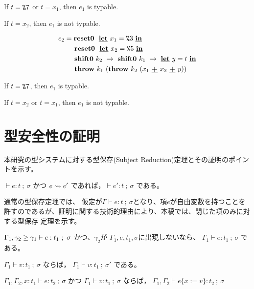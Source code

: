 If $t=\texttt{\%}{7}$ or $t=x_1$, then $e_1$ is typable.

If $t=x_2$, then $e_1$ is not typable.

\begin{align*}
  e_2 & = \textbf{reset0} ~~\underline{\textbf{let}}~x_1=\texttt{\%}{3}~\underline{\textbf{in}} \\
      & \phantom{=}~~ \textbf{reset0} ~~\underline{\textbf{let}}~x_2=\texttt{\%}{5}~\underline{\textbf{in}} \\
      & \phantom{=}~~ \textbf{shift0}~k_2~\to~ \textbf{shift0}~k_1~\to~ \underline{\textbf{let}}~y=t~\underline{\textbf{in}} \\
      & \phantom{=}~~ \textbf{throw}~k_1~(\textbf{throw}~k_2~(x_1~\underline{\textbf{+}}~x_2~\underline{\textbf{+}}~y))
\end{align*}

If $t=\texttt{\%}{7}$, then $e_1$ is typable.

If $t=x_2$ or $t=x_1$, then $e_1$ is not typable.

\section{型安全性の証明}

本研究の型システムに対する型保存(Subject Reduction)定理とその証明のポイントを示す。

\begin{theo}[型保存定理]
$\vdash e:t~;~\sigma$ かつ $e \leadsto e'$ であれば，$\vdash e':t~;~\sigma$ である。
\end{theo}

通常の型保存定理では、
仮定が$\Gamma \vdash e:t~;~\sigma$となり、項$e$が自由変数を持つことを
許すのであるが、証明に関する技術的理由により、本稿では、閉じた項のみに対する型保存
定理を示す。

\begin{lemm}[不要な仮定の除去]
  $\Gamma_1,\gamma_2 \ge \gamma_1 \vdash e : t_1 ~;~\sigma$
  かつ、$\gamma_2$が $\Gamma_1, e, t_1, \sigma$に出現しないなら、
  $\Gamma_1 \vdash e : t_1 ~;~\sigma$ である。
\end{lemm}

\begin{lemm}[値に関する性質]
  $\Gamma_1 \vdash v : t_1 ~;~\sigma$
  ならば，
  $\Gamma_1 \vdash v : t_1 ~;~\sigma'$
  である。
\end{lemm}

\begin{lemm}[代入]
  $\Gamma_1, \Gamma_2, x : t_1 \vdash e : t_2 ~;~\sigma$
  かつ
  $\Gamma_1 \vdash v : t_1 ~;~\sigma$
  ならば，
  $\Gamma_1, \Gamma_2 \vdash e\{x := v\} : t_2~;~\sigma$
\end{lemm}


